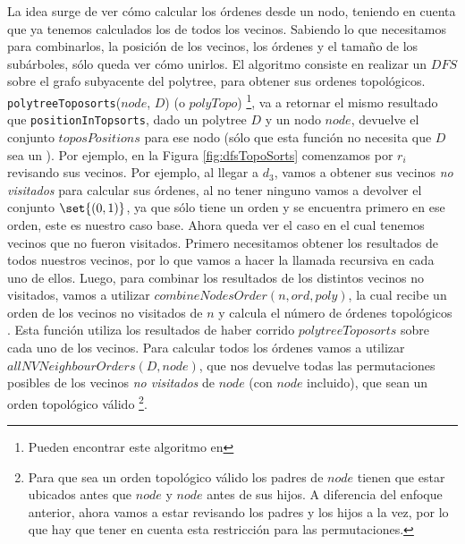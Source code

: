 La idea surge de ver cómo calcular los órdenes desde un nodo, teniendo en cuenta que ya tenemos calculados los de todos los vecinos. Sabiendo lo que necesitamos para combinarlos, la posición de los vecinos, los órdenes y el tamaño de los subárboles, sólo queda ver cómo unirlos. El algoritmo consiste en realizar un $DFS$ sobre el grafo subyacente del polytree, para obtener sus ordenes topológicos. \texttt{polytreeToposorts}($node$, $D$) (o $polyTopo$) \footnote{Pueden encontrar este algoritmo en }, va a retornar el mismo resultado que \texttt{positionInTopsorts}, dado un polytree $D$ y un nodo $node$, devuelve el conjunto $toposPositions$ para ese nodo (sólo que esta función no necesita que $D$ sea un \dtree). Por ejemplo, en la Figura \ref{fig:dfsTopoSorts} comenzamos por $r_i$ revisando sus vecinos. Por ejemplo, al llegar a $d_3$, vamos a obtener sus vecinos \emph{no visitados} para calcular sus órdenes, al no tener ninguno vamos a devolver el conjunto $\set{(0,1)}$, ya que sólo tiene un orden y se encuentra primero en ese orden, este es nuestro caso base. Ahora queda ver el caso en el cual tenemos vecinos que no fueron visitados. 
Primero necesitamos obtener los resultados de todos nuestros vecinos, por lo que vamos a hacer la llamada recursiva en cada uno de ellos. Luego, para combinar los resultados de los distintos vecinos no visitados, vamos a utilizar $combineNodesOrder(n, ord, poly)$, la cual recibe un orden de los vecinos no visitados de $n$ y calcula el número de órdenes topológicos . Esta función utiliza los resultados de haber corrido $polytreeToposorts$ sobre cada uno de los vecinos. Para calcular todos los órdenes vamos a utilizar $allNVNeighbourOrders(D,node)$, que nos devuelve todas las permutaciones posibles de los vecinos \emph{no visitados} de $node$ (con $node$ incluido), que sean un orden topológico válido \footnote{Para que sea un orden topológico válido los padres de $node$ tienen que estar ubicados antes que $node$ y $node$ antes de sus hijos. A diferencia del enfoque anterior, ahora vamos a estar revisando los padres y los hijos a la vez, por lo que hay que tener en cuenta esta restricción para las permutaciones.}.

